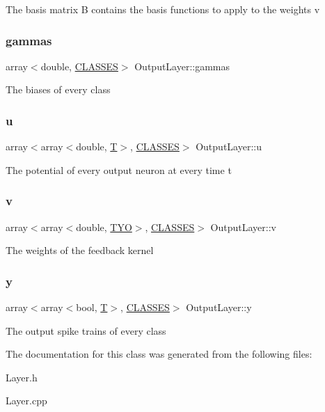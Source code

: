 The basis matrix B contains the basis functions to apply to the weights v \mbox{\label{class_output_layer_a7622e6982f5031e6facde898b65e8e88}} 
\subsubsection{\texorpdfstring{gammas}{gammas}}
{\footnotesize\ttfamily array$<$double, \mbox{\hyperlink{_constants_8h_a12148c0e36153a905f4f6ef1afdbb27e}{C\+L\+A\+S\+S\+ES}}$>$ Output\+Layer\+::gammas}

The biases of every class \mbox{\label{class_output_layer_abce2a9dfa14ad6014f34ca523a24a09b}} 
\subsubsection{\texorpdfstring{u}{u}}
{\footnotesize\ttfamily array$<$array$<$double, \mbox{\hyperlink{_constants_8h_a6108cec236ef7a2e1d3259931de87186}{T}}$>$, \mbox{\hyperlink{_constants_8h_a12148c0e36153a905f4f6ef1afdbb27e}{C\+L\+A\+S\+S\+ES}}$>$ Output\+Layer\+::u\hspace{0.3cm}{\ttfamily [protected]}}

The potential of every output neuron at every time t \mbox{\label{class_output_layer_a1e0b9c3531cfb70a628330287f2f0f51}} 
\subsubsection{\texorpdfstring{v}{v}}
{\footnotesize\ttfamily array$<$array$<$double, \mbox{\hyperlink{_constants_8h_ade2b686fe2ed5231b32fced73d812981}{T\+YO}}$>$, \mbox{\hyperlink{_constants_8h_a12148c0e36153a905f4f6ef1afdbb27e}{C\+L\+A\+S\+S\+ES}}$>$ Output\+Layer\+::v}

The weights of the feedback kernel \mbox{\label{class_output_layer_a879082b1b83f40d8c0af479a814f931c}} 
\subsubsection{\texorpdfstring{y}{y}}
{\footnotesize\ttfamily array$<$array$<$bool, \mbox{\hyperlink{_constants_8h_a6108cec236ef7a2e1d3259931de87186}{T}}$>$, \mbox{\hyperlink{_constants_8h_a12148c0e36153a905f4f6ef1afdbb27e}{C\+L\+A\+S\+S\+ES}}$>$ Output\+Layer\+::y\hspace{0.3cm}{\ttfamily [protected]}}

The output spike trains of every class 

The documentation for this class was generated from the following files\+:\begin{DoxyCompactItemize}
\item 
Layer.\+h\item 
Layer.\+cpp\end{DoxyCompactItemize}
